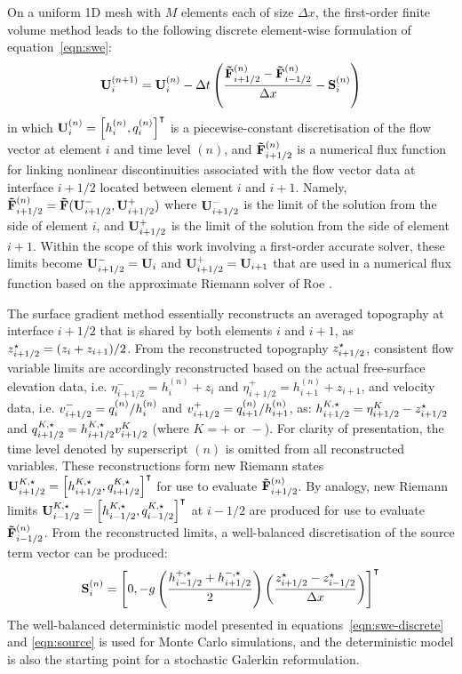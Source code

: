 On a uniform 1D mesh with $M$ elements each of size $\Delta x$, the first-order finite volume method leads to the following discrete element-wise formulation of equation~\eqref{eqn:swe}:
\begin{align}
    \mathbf{U}_i^{(n+1)} = \mathbf{U}_i^{(n)} - \Delta t
    \left(
    \frac{\mathbf{\tilde{F}}_{i+1/2}^{(n)} - \mathbf{\tilde{F}}_{i-1/2}^{(n)}}{\Delta x}
    - \mathbf{S}_i^{(n)} \right) \label{eqn:swe-discrete}
\end{align}
in which $\mathbf{U}_i^{(n)} = \left[ h_i^{(n)}, q_i^{(n)} \right]^\intercal$ is a piecewise-constant discretisation of the flow vector at element $i$ and time level $(n)$, and $\mathbf{\tilde{F}}_{i+1/2}^{(n)}$ is a numerical flux function for linking nonlinear discontinuities associated with the flow vector data at interface $i+1/2$ located between element $i$ and $i + 1$.
Namely, $\mathbf{\tilde{F}}_{i+1/2}^{(n)} = \mathbf{\tilde{F}}(\mathbf{U}_{i+1/2}^-, \mathbf{U}_{i+1/2}^+)$ where $\mathbf{U}_{i+1/2}^-$ is the limit of the solution from the side of element $i$, and $\mathbf{U}_{i+1/2}^+$ is the limit of the solution from the side of element $i+1$.
Within the scope of this work involving a first-order accurate solver, these limits become $\mathbf{U}_{i+1/2}^- = \mathbf{U}_i$ and $\mathbf{U}_{i+1/2}^+ = \mathbf{U}_{i+1}$ that are used in a numerical flux function based on the approximate Riemann solver of Roe \citep{roe-pike1984}.

The surface gradient method essentially reconstructs an averaged topography at interface $i+1/2$ that is shared by both elements $i$ and $i+1$, as $z^\star_{i+1/2} = (z_i + z_{i+1})/2$.
From the reconstructed topography $z^\star_{i+1/2}$, consistent flow variable limits are accordingly reconstructed based on the actual free-surface elevation data, i.e. $\eta_{i+1/2}^- = h_i^{(n)} + z_i$ and $\eta_{i+1/2}^+ = h_{i+1}^{(n)} + z_{i+1}$, and velocity data, i.e. $v_{i+1/2}^- = q_i^{(n)}/h_i^{(n)}$ and $v_{i+1/2}^+ = q_{i+1}^{(n)} / h_{i+1}^{(n)}$, as: $h^{K,\star}_{i+1/2} = \eta_{i+1/2}^K - z^\star_{i+1/2}$ and $q^{K,\star}_{i+1/2} = h^{K,\star}_{i+1/2} v_{i+1/2}^K$ (where $K = + \text{ or } -$).
For clarity of presentation, the time level denoted by superscript $(n)$ is omitted from all reconstructed variables.
These reconstructions form new Riemann states $\mathbf{U}^{K,\star}_{i+1/2} = \left[ h^{K,\star}_{i+1/2}, q^{K,\star}_{i+1/2} \right]^\intercal$ for use to evaluate $\mathbf{\tilde{F}}_{i+1/2}^{(n)}$.
By analogy, new Riemann limits $\mathbf{U}^{K,\star}_{i-1/2} = \left[ h^{K,\star}_{i-1/2}, q^{K,\star}_{i-1/2} \right]^\intercal$ at $i - 1/2$ are produced for use to evaluate $\mathbf{\tilde{F}}_{i-1/2}^{(n)}$.
From the reconstructed limits, a well-balanced discretisation of the source term vector can be produced:
\begin{align}
	\mathbf{S}_i^{(n)} = \left[ 0, -g
	\left( \frac{h^{+,\star}_{i-1/2} + h^{-,\star}_{i+1/2}}{2} \right)
	\left( \frac{z^\star_{i+1/2} - z^\star_{i-1/2}}{\Delta x} \right)
	\right]^\intercal
	\label{eqn:source}
\end{align}
The well-balanced deterministic model presented in equations~\eqref{eqn:swe-discrete} and \eqref{eqn:source} is used for Monte Carlo simulations, and the deterministic model is also the starting point for a stochastic Galerkin reformulation.

